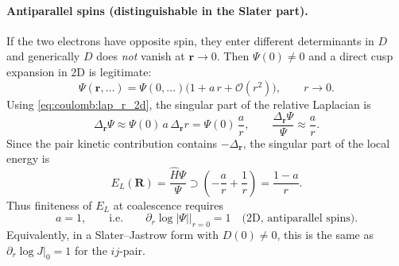 \paragraph{Antiparallel spins (distinguishable in the Slater part).}
If the two electrons have opposite spin, they enter different determinants in $D$
and generically $D$ does \emph{not} vanish at $\mathbf r\to 0$. Then $\Psi(0)\neq 0$ and
a direct cusp expansion in 2D is legitimate:
\begin{equation}
\Psi(\mathbf r,\ldots)
=
\Psi(0,\ldots)\Big(1 + a\,r + \mathcal O(r^2)\Big),
\qquad r\to 0.
\label{eq:coulomb:expansion_anti}
\end{equation}
Using \eqref{eq:coulomb:lap_r_2d}, the singular part of the relative Laplacian is
\begin{equation}
\Delta_{\mathbf r}\Psi \approx \Psi(0)\,a\,\Delta_{\mathbf r}r
= \Psi(0)\,\frac{a}{r},
\qquad
\frac{\Delta_{\mathbf r}\Psi}{\Psi}\approx \frac{a}{r}.
\label{eq:coulomb:lap_sing_2d}
\end{equation}
Since the pair kinetic contribution contains $-\Delta_{\mathbf r}$, the singular part
of the local energy is
\begin{equation}
E_L(\mathbf R)=\frac{\hat H\Psi}{\Psi}\supset \left(-\frac{a}{r}+\frac{1}{r}\right)
=\frac{1-a}{r}.
\label{eq:coulomb:EL_sing_2d_anti}
\end{equation}
Thus finiteness of $E_L$ at coalescence requires
\begin{equation}
a=1,
\qquad\text{i.e.}\qquad
\left.\partial_r \log |\Psi|\right|_{r=0}=1
\quad\text{(2D, antiparallel spins)}.
\label{eq:coulomb:cusp_2d_anti}
\end{equation}
Equivalently, in a Slater--Jastrow form with $D(0)\neq 0$,
this is the same as $\partial_r\log J|_{0}=1$ for the $ij$-pair.

